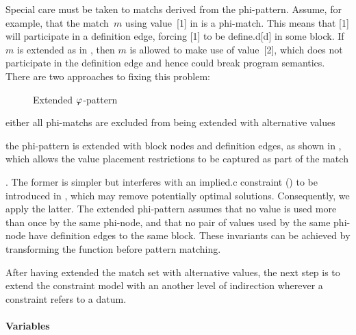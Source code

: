 Special care must be taken to \glspl{match} derived from the \gls{phi-pattern}.
%
Assume, for example, that the \gls{match}~$m$ using value~[1] in
 is a \gls{phi-match}.
%
This means that [1] will participate in a \gls{definition edge},
forcing [1] to be \gls{define.d}[d] in some \gls{block}.
%
If $m$ is extended as in , then $m$ is
allowed to make use of value~[2], which does not participate in the
\gls{definition edge} and hence could break \gls{program} semantics.
%
There are two approaches to fixing this problem:
%
\begin{figure}
  \centering%
  

  \caption{Extended $\varphi$-pattern}
\end{figure}
%
\begin{inlinelist}[label=(\roman*), itemjoin={; }, itemjoin*={; or\ }]
  \item either all \glspl{phi-match} are excluded from being extended with
    \glspl{alternative value}
  \item the \gls{phi-pattern} is extended with \glspl{block node} and
    \glspl{definition edge}, as shown in , which
    allows the value placement restrictions to be captured as part of the
    \gls{match}
\end{inlinelist}.
%
The former is simpler but interferes with an \gls{implied.c} \gls{constraint}
() to be introduced in
, which may remove potentially optimal
\glspl{solution}.
%
Consequently, we apply the latter.
%
The extended \gls{phi-pattern} assumes that no value is used more than once by
the same \gls{phi-node}, and that no pair of values used by the same
\gls{phi-node} have \glspl{definition edge} to the same \gls{block}.
%
These invariants can be achieved by transforming the \gls{function} before
\gls{pattern matching}.

After having extended the \gls{match set} with \glspl{alternative value}, the
next step is to extend the \gls{constraint model} with an another level of
indirection wherever a \gls{constraint} refers to a \gls{datum}.


\paragraph{Variables}

